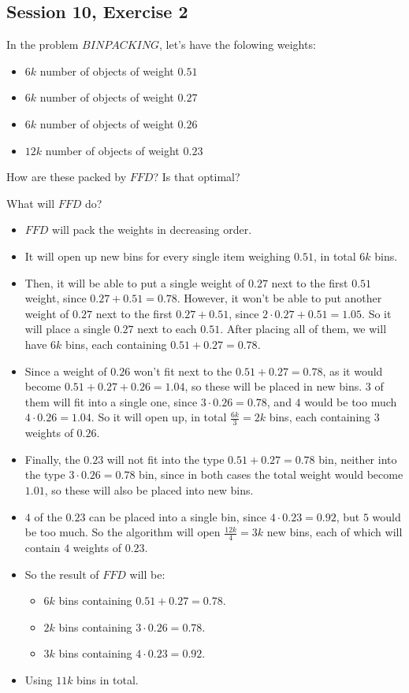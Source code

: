 \subsection {Session 10, Exercise 2}


In the problem $BINPACKING$, let's have the folowing weights:
\begin{itemize}
    \item $6k$ number of objects of weight $0.51$
    \item $6k$ number of objects of weight $0.27$
    \item $6k$ number of objects of weight $0.26$
    \item $12k$ number of objects of weight $0.23$
\end{itemize}

How are these packed by $FFD$? Is that optimal?


What will $FFD$ do?

\begin{itemize}
    \item $FFD$ will pack the weights in decreasing order.
    \item It will open up new bins for every single item weighing $0.51$, in total $6k$ bins.
    \item Then, it will be able to put a single weight of $0.27$ next to the first $0.51$ weight, since $0.27+0.51=0.78$. However, it won't be able to put another weight of $0.27$ next to the first $0.27+0.51$, since $2\cdot{}0.27+0.51=1.05$. So it will place a single $0.27$ next to each $0.51$. After placing all of them, we will have $6k$ bins, each containing $0.51+0.27=0.78$.
    \item Since a weight of $0.26$ won't fit next to the $0.51+0.27=0.78$, as it would become $0.51+0.27+0.26=1.04$, so these will be placed in new bins. $3$ of them will fit into a single one, since $3\cdot{}0.26=0.78$, and $4$ would be too much $4\cdot{}0.26=1.04$. So it will open up, in total $\frac{6k}{3}=2k$ bins, each containing $3$ weights of $0.26$.
    \item Finally, the $0.23$ will not fit into the type $0.51+0.27=0.78$ bin, neither into the type $3\cdot{}0.26=0.78$ bin, since in both cases the total weight would become $1.01$, so these will also be placed into new bins.
    \item $4$ of the $0.23$ can be placed into a single bin, since $4\cdot{}0.23=0.92$, but $5$ would be too much. So the algorithm will open $\frac{12k}{4}=3k$ new bins, each of which will contain $4$ weights of $0.23$.
    \item So the result of $FFD$ will be:
    \begin{itemize}
        \item $6k$ bins containing $0.51+0.27=0.78$.
        \item $2k$ bins containing $3\cdot{}0.26=0.78$.
        \item $3k$ bins containing $4\cdot{}0.23=0.92$.
    \end{itemize}
    \item Using $11k$ bins in total.
\end{itemize}

